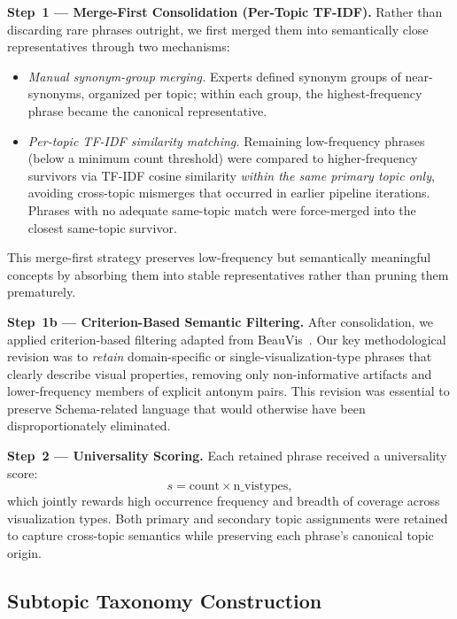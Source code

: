 \documentclass[journal]{IEEEtran}
\begin{document}
\noindent\textbf{Step~1 — Merge-First Consolidation (Per-Topic TF-IDF).}
Rather than discarding rare phrases outright, we first merged them into semantically close representatives through two mechanisms:
\begin{itemize}
  \item \textit{Manual synonym-group merging.}
    Experts defined synonym groups of near-synonyms, organized per topic;
    within each group, the highest-frequency phrase became the canonical representative.
  \item \textit{Per-topic TF-IDF similarity matching.}
    Remaining low-frequency phrases (below a minimum count threshold) were compared to higher-frequency survivors via TF-IDF cosine similarity \emph{within the same primary topic only}, avoiding cross-topic mismerges that occurred in earlier pipeline iterations. Phrases with no adequate same-topic match were force-merged into the closest same-topic survivor.
\end{itemize}
This merge-first strategy preserves low-frequency but semantically meaningful concepts by absorbing them into stable representatives rather than pruning them prematurely.

\noindent\textbf{Step~1b — Criterion-Based Semantic Filtering.}
After consolidation, we applied criterion-based filtering adapted from BeauVis~\cite{he2022beauvis}.
Our key methodological revision was to \emph{retain} domain-specific or single-visualization-type phrases that clearly describe visual properties, removing only non-informative artifacts and lower-frequency members of explicit antonym pairs.
This revision was essential to preserve Schema-related language that would otherwise have been disproportionately eliminated.

\noindent\textbf{Step~2 — Universality Scoring.}
Each retained phrase received a universality score:
\begin{equation}
  \label{eq:uscore}
  s = \mathrm{count} \times \mathrm{n\_vistypes},
\end{equation}
which jointly rewards high occurrence frequency and breadth of coverage across visualization types.
Both primary and secondary topic assignments were retained to capture cross-topic semantics while preserving each phrase's canonical topic origin.

\subsection{Subtopic Taxonomy Construction}
\label{sec:taxonomy}
\end{document}
